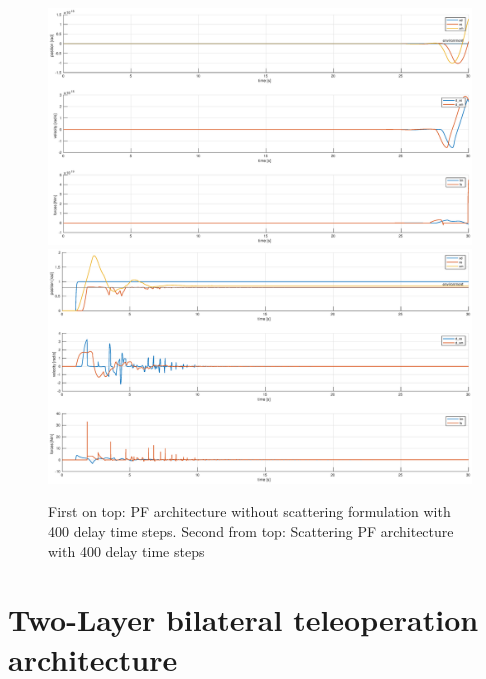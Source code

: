\documentclass[a4paper,12pt]{article}
\begin{document}
\begin{figure}[H]
    \hspace*{-3.5cm}
    \includegraphics[scale=0.45]{images/scatt_high_delay.eps}
    \qquad
    \hspace*{-3.5cm}
    \includegraphics[scale=0.45]{images/scatt_high_delay_comp.eps}
    \caption{First on top: PF architecture without scattering formulation with 400 delay time steps. Second from top: Scattering PF architecture with 400 delay time steps}
    \label{fig:delay_comp}
\end{figure}

\newpage
\section{Two-Layer bilateral teleoperation architecture}
\end{document}
